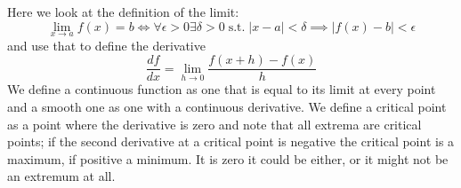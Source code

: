 \documentclass[12pt]{article}
\begin{document}
Here we look at the definition of the limit:
\begin{equation}
  \lim_{x\rightarrow a}f(x)=b\iff\forall\epsilon>0\exists\delta>0\;\mbox{s.t.}\;|x-a|<\delta\implies|f(x)-b|<\epsilon
\end{equation}
and use that to define the derivative
\begin{equation}
  \frac{df}{dx}=\lim_{h\rightarrow 0}\frac{f(x+h)-f(x)}{h}
\end{equation}
We define a continuous function as one that is equal to its limit at
every point and a smooth one as one with a continuous derivative. We
define a critical point as a point where the derivative is zero and
note that all extrema are critical points; if the second derivative at
a critical point is negative the critical point is a maximum, if
positive a minimum. It is zero it could be either, or it might not be
an extremum at all.
\end{document}
